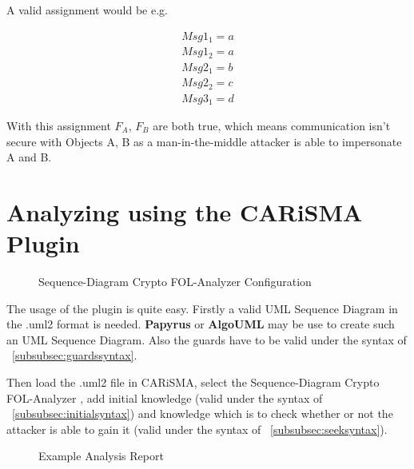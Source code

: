 \documentclass[12pt,journal,compsoc]{IEEEtran}
\newcommand{\Peers}[0]{Objects }
\newcommand{\MITMA}[0]{man-in-the-middle attacker }
\newcommand{\linesep}[0]{\newline}
\newcommand{\SDC}[0]{Sequence-Diagram Crypto FOL-Analyzer }
\begin{document}
A valid assignment would be e.g.
\begin{small}
\begin{align*}
	Msg1_1 = a \\
	Msg1_2 = a \\
	Msg2_1 = b \\
	Msg2_2 = c \\
	Msg3_1 = d 
\end{align*}
\end{small}

With this assignment $F_A$, $F_B$ are both true, which means communication 
isn't secure with \Peers A, B as a \MITMA is able to impersonate A and B.

\section{Analyzing using the CARiSMA Plugin}

\begin{figure}[!t]
	\centering
	\caption{\SDC Configuration}
	\label{fig:GUI}
\end{figure}

The usage of the plugin is quite easy. Firstly a valid UML Sequence Diagram 
in the .uml2 format is needed. \textbf{Papyrus} or \textbf{AlgoUML} may be use to create such 
an UML Sequence Diagram. Also the guards have to be valid under the syntax of ~\ref{subsubsec:guardssyntax}.
\linesep

Then load the .uml2 file in CARiSMA, select the \SDC, add initial knowledge (valid under the syntax of ~\ref{subsubsec:initialsyntax})
and knowledge which is to check whether or not the attacker is able to gain it (valid under the syntax of ~\ref{subsubsec:seeksyntax}).

\begin{figure}[!t]
	\centering
	\caption{Example Analysis Report}
	\label{fig:GUI}
\end{figure}
\end{document}
